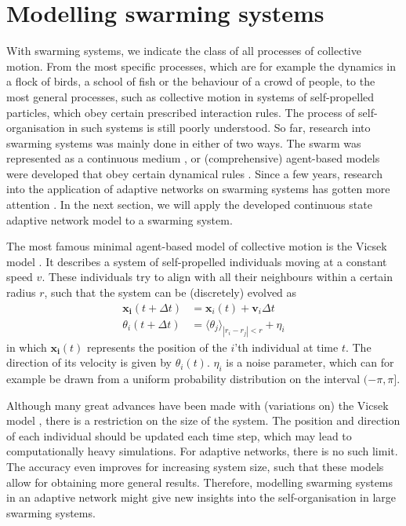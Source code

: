 \chapter{Modelling swarming systems}
\label{chapter:swarming_systems}
With swarming systems, we indicate the class of all processes of collective motion. From the most specific processes, which are for example the dynamics in a flock of birds, a school of fish or the behaviour of a crowd of people, to the most general processes, such as collective motion in systems of self-propelled particles, which obey certain prescribed interaction rules. The process of self-organisation in such systems is still poorly understood. So far, research into swarming systems was mainly done in either of two ways. The swarm was represented as a continuous medium \cite{Toner1998}, or (comprehensive) agent-based models were developed that obey certain dynamical rules \cite{Huepe2011, VanDrongelen2015, Vicsek1995, Vicsek2012}. Since a few years, research into the application of adaptive networks on swarming systems has gotten more attention \cite{Huepe2011, Chen2016, Zschaler2012}. In the next section, we will apply the developed continuous state adaptive network model to a swarming system.

The most famous minimal agent-based model of collective motion is the Vicsek model \cite{Vicsek1995}. It describes a system of self-propelled individuals moving at a constant speed $v$. These individuals try to align with all their neighbours within a certain radius $r$, such that the system can be (discretely) evolved as 
\begin{subequations}
\begin{alignat}{2}
	\bm{x_i}(t+\Delta t) &= \bm{x}_i(t) + \bm{v}_i \Delta t\\
	\theta_i(t+\Delta t) &= \langle \theta_j \rangle_{|r_i - r_j | <r} + \eta_i
\end{alignat}
\end{subequations}
in which $\bm{x_i}(t)$ represents the position of the $i$'th individual at time $t$. The direction of its velocity is given by $\theta_i(t)$. $\eta_i$ is a noise parameter, which can for example be drawn from a uniform probability distribution on the interval $(-\pi,\pi]$.

Although many great advances have been made with (variations on) the Vicsek model \cite{Vicsek2012}, there is a restriction on the size of the system. The position and direction of each individual should be updated each time step, which may lead to computationally heavy simulations. For adaptive networks, there is no such limit. The accuracy even improves for increasing system size, such that these models allow for obtaining more general results. Therefore, modelling swarming systems in an adaptive network might give new insights into the self-organisation in large swarming systems. 


